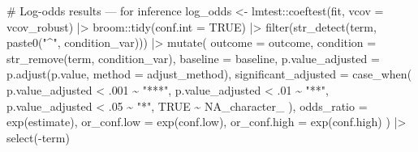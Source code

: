 \documentclass[
  letterpaper,
  DIV=11,
  numbers=noendperiod]{scrartcl}
\newenvironment{Shaded}{\begin{snugshade}}{\end{snugshade}}
\newcommand{\AttributeTok}[1]{\textcolor[rgb]{0.40,0.45,0.13}{#1}}
\newcommand{\CommentTok}[1]{\textcolor[rgb]{0.37,0.37,0.37}{#1}}
\newcommand{\ConstantTok}[1]{\textcolor[rgb]{0.56,0.35,0.01}{#1}}
\newcommand{\DecValTok}[1]{\textcolor[rgb]{0.68,0.00,0.00}{#1}}
\newcommand{\FunctionTok}[1]{\textcolor[rgb]{0.28,0.35,0.67}{#1}}
\newcommand{\NormalTok}[1]{\textcolor[rgb]{0.00,0.23,0.31}{#1}}
\newcommand{\OtherTok}[1]{\textcolor[rgb]{0.00,0.23,0.31}{#1}}
\newcommand{\SpecialCharTok}[1]{\textcolor[rgb]{0.37,0.37,0.37}{#1}}
\newcommand{\StringTok}[1]{\textcolor[rgb]{0.13,0.47,0.30}{#1}}
\begin{document}
\begin{Shaded}
\begin{Highlighting}[]
  \CommentTok{\# Log{-}odds results — for inference}
\NormalTok{  log\_odds }\OtherTok{\textless{}{-}}\NormalTok{ lmtest}\SpecialCharTok{::}\FunctionTok{coeftest}\NormalTok{(fit, }\AttributeTok{vcov =}\NormalTok{ vcov\_robust) }\SpecialCharTok{|\textgreater{}}
\NormalTok{    broom}\SpecialCharTok{::}\FunctionTok{tidy}\NormalTok{(}\AttributeTok{conf.int =} \ConstantTok{TRUE}\NormalTok{) }\SpecialCharTok{|\textgreater{}}
    \FunctionTok{filter}\NormalTok{(}\FunctionTok{str\_detect}\NormalTok{(term, }\FunctionTok{paste0}\NormalTok{(}\StringTok{"\^{}"}\NormalTok{, condition\_var))) }\SpecialCharTok{|\textgreater{}}
    \FunctionTok{mutate}\NormalTok{(}
      \AttributeTok{outcome              =}\NormalTok{ outcome,}
      \AttributeTok{condition            =} \FunctionTok{str\_remove}\NormalTok{(term, condition\_var),}
      \AttributeTok{baseline             =}\NormalTok{ baseline,}
      \AttributeTok{p.value\_adjusted     =} \FunctionTok{p.adjust}\NormalTok{(p.value, }\AttributeTok{method =}\NormalTok{ adjust\_method),}
      \AttributeTok{significant\_adjusted =} \FunctionTok{case\_when}\NormalTok{(}
\NormalTok{        p.value\_adjusted }\SpecialCharTok{\textless{}}\NormalTok{ .}\DecValTok{001} \SpecialCharTok{\textasciitilde{}} \StringTok{"***"}\NormalTok{,}
\NormalTok{        p.value\_adjusted }\SpecialCharTok{\textless{}}\NormalTok{ .}\DecValTok{01}  \SpecialCharTok{\textasciitilde{}} \StringTok{"**"}\NormalTok{,}
\NormalTok{        p.value\_adjusted }\SpecialCharTok{\textless{}}\NormalTok{ .}\DecValTok{05}  \SpecialCharTok{\textasciitilde{}} \StringTok{"*"}\NormalTok{,}
        \ConstantTok{TRUE}                    \SpecialCharTok{\textasciitilde{}} \ConstantTok{NA\_character\_}
\NormalTok{      ),}
      \AttributeTok{odds\_ratio   =} \FunctionTok{exp}\NormalTok{(estimate),}
      \AttributeTok{or\_conf.low  =} \FunctionTok{exp}\NormalTok{(conf.low),}
      \AttributeTok{or\_conf.high =} \FunctionTok{exp}\NormalTok{(conf.high)}
\NormalTok{    ) }\SpecialCharTok{|\textgreater{}}
    \FunctionTok{select}\NormalTok{(}\SpecialCharTok{{-}}\NormalTok{term)}
  

\end{Highlighting}
\end{Shaded}
\end{document}
